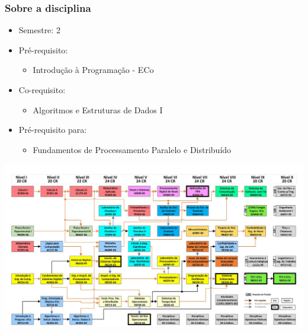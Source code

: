 \documentclass[aspectratio=169]{beamer}
\begin{document}
\begin{frame}\frametitle{Sobre a disciplina}
\begin{itemize}
	\item Semestre: 2
	\item Pré-requisito:
		\begin{itemize}
			\item Introdução à Programação - ECo
		\end{itemize}
	\item Co-requisito:
		\begin{itemize}
			\item Algoritmos e Estruturas de Dados I
		\end{itemize}
	\item Pré-requisito para:
		\begin{itemize}
			\item Fundamentos de Processamento Paralelo e Distribuído
		\end{itemize}
\end{itemize}
\end{frame}


\begin{frame}[plain] %
    \begin{center}
        \includegraphics[width=\textwidth]{pucrs-ec-matriz-curricular.jpg} %
    \end{center}
\end{frame}
\end{document}
